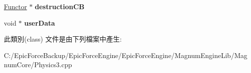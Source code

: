 \begin{DoxyCompactItemize}
\item 
\hyperlink{class_magnum_1_1_functor}{Functor} $\ast$ {\bfseries destruction\+CB}\hypertarget{class_magnum_1_1_rigid_body_desc_ad708993a1d1ae8f81a845d4b6ec24c4d}{}\label{class_magnum_1_1_rigid_body_desc_ad708993a1d1ae8f81a845d4b6ec24c4d}

\item 
void $\ast$ {\bfseries user\+Data}\hypertarget{class_magnum_1_1_rigid_body_desc_adbd29dbfbde6ea132003fbfd8fadb4ef}{}\label{class_magnum_1_1_rigid_body_desc_adbd29dbfbde6ea132003fbfd8fadb4ef}

\end{DoxyCompactItemize}


此類別(class) 文件是由下列檔案中產生\+:\begin{DoxyCompactItemize}
\item 
C\+:/\+Epic\+Force\+Backup/\+Epic\+Force\+Engine/\+Epic\+Force\+Engine/\+Magnum\+Engine\+Lib/\+Magnum\+Core/Physics3.\+cpp\end{DoxyCompactItemize}
